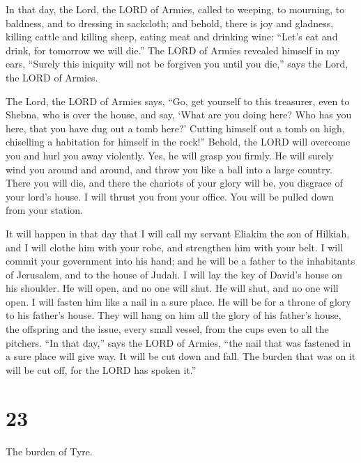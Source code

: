  In that day, the Lord, the LORD of Armies, called to
weeping, to mourning, to baldness, and to dressing in sackcloth;
 and behold, there is joy and gladness, killing cattle
and killing sheep, eating meat and drinking wine: ``Let's eat and drink,
for tomorrow we will die.''  The LORD of Armies revealed
himself in my ears, ``Surely this iniquity will not be forgiven you
until you die,'' says the Lord, the LORD of Armies.

 The Lord, the LORD of Armies says, ``Go, get yourself to
this treasurer, even to Shebna, who is over the house, and say,
 `What are you doing here? Who has you here, that you
have dug out a tomb here?' Cutting himself out a tomb on high,
chiselling a habitation for himself in the rock!'' 
Behold, the LORD will overcome you and hurl you away violently. Yes, he
will grasp you firmly.  He will surely wind you around
and around, and throw you like a ball into a large country. There you
will die, and there the chariots of your glory will be, you disgrace of
your lord's house.  I will thrust you from your office.
You will be pulled down from your station.

 It will happen in that day that I will call my servant
Eliakim the son of Hilkiah,  and I will clothe him with
your robe, and strengthen him with your belt. I will commit your
government into his hand; and he will be a father to the inhabitants of
Jerusalem, and to the house of Judah.  I will lay the key
of David's house on his shoulder. He will open, and no one will shut. He
will shut, and no one will open.  I will fasten him like
a nail in a sure place. He will be for a throne of glory to his father's
house.  They will hang on him all the glory of his
father's house, the offspring and the issue, every small vessel, from
the cups even to all the pitchers.  ``In that day,'' says
the LORD of Armies, ``the nail that was fastened in a sure place will
give way. It will be cut down and fall. The burden that was on it will
be cut off, for the LORD has spoken it.''

\hypertarget{section-22}{%
\section{23}\label{section-22}}

 The burden of Tyre.

